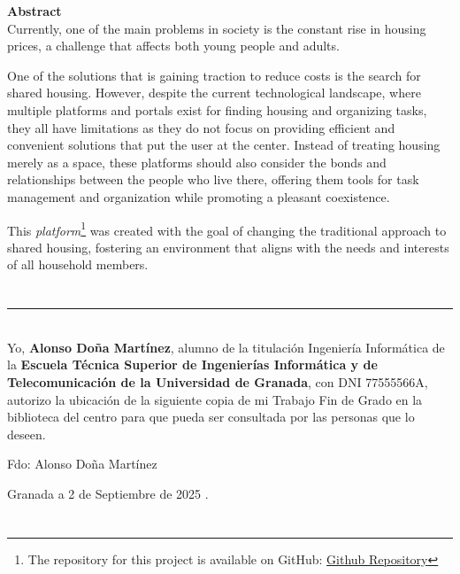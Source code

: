 \noindent\textbf{Abstract}\\

Currently, one of the main problems in society is the constant rise in housing prices, a challenge that affects both young people and adults.

One of the solutions that is gaining traction to reduce costs is the search for 
shared housing. However, despite the current technological landscape, where 
multiple platforms and portals exist for finding housing and organizing tasks, 
they all have limitations as they do not focus on providing efficient and 
convenient solutions that put the user at the center. Instead of treating 
housing merely as a space, these platforms should also consider the bonds and 
relationships between the people who live there, offering them tools for task 
management and organization while promoting a pleasant coexistence.

This \textit{platform}\footnote{The repository for this project is available on GitHub: 
\href{https://github.com/alonsodm12/TFG_COHOUSING}{Github Repository}} was created with the goal of changing the traditional approach to 
shared housing, fostering an environment that aligns with the needs and 
interests of all household members.

\chapter*{}
\thispagestyle{empty}

\noindent\rule[-1ex]{\textwidth}{2pt}\\[4.5ex]

Yo, \textbf{Alonso Doña Martínez}, alumno de la titulación Ingeniería Informática de la \textbf{Escuela Técnica Superior
de Ingenierías Informática y de Telecomunicación de la Universidad de Granada}, con DNI 77555566A, autorizo la
ubicación de la siguiente copia de mi Trabajo Fin de Grado en la biblioteca del centro para que pueda ser
consultada por las personas que lo deseen.

\vspace{6cm}

\noindent Fdo: Alonso Doña Martínez

\vspace{2cm}

\begin{flushright}
Granada a 2 de Septiembre de 2025 .
\end{flushright}
\chapter*{}
\thispagestyle{empty}

